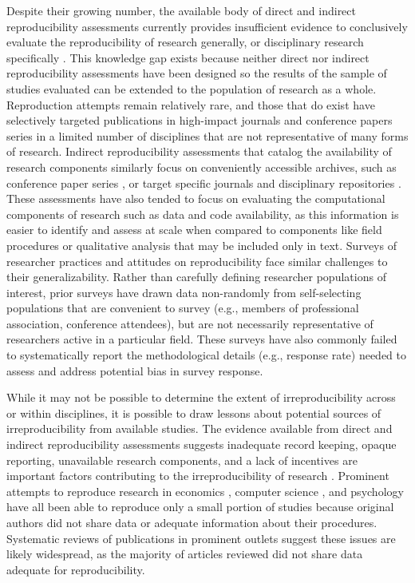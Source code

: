 \documentclass[]{interact}
\theoremstyle{plain}%
\theoremstyle{definition}
\theoremstyle{remark}
\begin{document}
Despite their growing number, the available body of direct and indirect reproducibility assessments currently provides insufficient evidence to conclusively evaluate the reproducibility of research generally, or disciplinary research specifically \citep{NASEM2019}.
This knowledge gap exists because neither direct nor indirect reproducibility assessments have been designed so the results of the sample of studies evaluated can be extended to the population of research as a whole. 
Reproduction attempts remain relatively rare, and those that do exist \citep[see][]{chang2015economics, moraila2014measuring} have selectively targeted publications in high-impact journals and conference papers series in a limited number of disciplines that are not representative of many forms of research.    
Indirect reproducibility assessments that catalog the availability of research components similarly focus on conveniently accessible archives, such as conference paper series \citep{gundersen2018state, ostermann2017}, or target specific journals and disciplinary repositories \citep{stodden2018empirical, stodden2018enabling, byrne_2017}.
These assessments have also tended to focus on evaluating the computational components of research such as data and code availability, as this information is easier to identify and assess at scale when compared to components like field procedures or qualitative analysis that may be included only in text. 
Surveys of researcher practices and attitudes on reproducibility face similar challenges to their generalizability. 
Rather than carefully defining researcher populations of interest, prior surveys have drawn data non-randomly from self-selecting populations that are convenient to survey (e.g., members of professional association, conference attendees), but are not necessarily representative of researchers active in a particular field. 
These surveys have also commonly failed to systematically report the methodological details (e.g., response rate) needed to assess and address potential bias in survey response. 

While it may not be possible to determine the extent of irreproducibility across or within disciplines, it is possible to draw lessons about potential sources of irreproducibility from available studies.
The evidence available from direct and indirect reproducibility assessments suggests inadequate record keeping, opaque reporting, unavailable research components, and a lack of incentives are important factors contributing to the irreproducibility of research \citep{NASEM2019}. 
Prominent attempts to reproduce research in economics \citep{chang2015economics}, computer science \citep{moraila2014measuring}, and psychology \citep{open2015estimating} have all been able to reproduce only a small portion of studies because original authors did not share data or adequate information about their procedures. 
Systematic reviews of publications in prominent outlets \citep{byrne_2017,stodden2018empirical} suggest these issues are likely widespread, as the majority of articles reviewed did not share data adequate for reproducibility.
\end{document}

